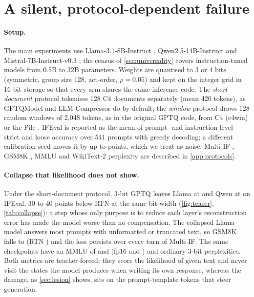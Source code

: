 \section{A silent, protocol-dependent failure}
\label{sec:phenomenon}
\paragraph{Setup.}
The main experiments use Llama-3.1-8B-Instruct \citep{grattafiori2024llama3}, Qwen2.5-14B-Instruct \citep{qwen2025qwen25} and Mistral-7B-Instruct-v0.3 \citep{jiang2023mistral}; the census of \cref{sec:universality} covers \nCensus{} instruction-tuned models from 0.5B to 32B parameters.
Weights are quantised to 3 or 4 bits (symmetric, group size 128, act-order, $\rho=0.05$) and kept on the integer grid in 16-bit storage so that every arm shares the same inference code.
The \emph{short-document} protocol tokenises 128 C4 documents \citep{raffel2020c4} separately (mean 420 tokens), as GPTQModel \citep{gptqmodel} and LLM Compressor \citep{llmcompressor} do by default; the \emph{window} protocol draws 128 random windows of 2,048 tokens, as in the original GPTQ code, from C4 (c4win) or the Pile \citep{gao2021pile}.
IFEval \citep{zhou2023ifeval} is reported as the mean of prompt- and instruction-level strict and loose accuracy over 541 prompts with greedy decoding; a different calibration seed moves it by up to \SeedNoise{} points, which we treat as noise.
Multi-IF \citep{he2024multiif}, GSM8K \citep{cobbe2021gsm8k}, MMLU \citep{hendrycks2021mmlu} and WikiText-2 perplexity \citep{merity2017wikitext} are described in \cref{app:protocols}.

\paragraph{Collapse that likelihood does not show.}
Under the short-document protocol, 3-bit GPTQ leaves Llama at \LgptqIF{} and Qwen at \QgptqIF{} on IFEval, 30 to 40 points below RTN at the same bit-width (\cref{fig:teaser}, \cref{tab:collapse}): a step whose only purpose is to reduce each layer's reconstruction error has made the model worse than no compensation.
The collapsed Llama model answers most prompts with unformatted or truncated text, so GSM8K falls to \LgptqGSM{} (RTN \LrtnGSM{}) and the loss persists over every turn of Multi-IF.
The same checkpoints have an MMLU of \LgptqMMLU{} and \QgptqMMLU{} (fp16 \LfpMMLU{} and \QfpMMLU{}) and ordinary 3-bit perplexities.
Both metrics are teacher-forced: they score the likelihood of given text and never visit the states the model produces when writing its own response, whereas the damage, as \cref{sec:lesion} shows, sits on the prompt-template tokens that steer generation.

